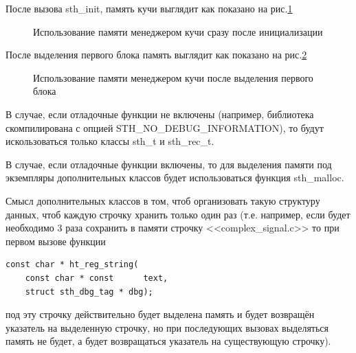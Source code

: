 \documentclass{article}
\begin{document}
После вызова sth\_init, память кучи выглядит как показано на рис.\ref{ris:memory1}
\begin{figure}[h!]
	\caption{Использование памяти менеджером кучи сразу после инициализации}
	\label{ris:memory1}
	\end{figure}

После выделения первого блока память выглядит как показано на рис.\ref{ris:memory2}
\begin{figure}[h!]
	\caption{Использование памяти менеджером кучи после выделения первого блока}
	\label{ris:memory2}
	\end{figure}

\newpage
В случае, если отладочные функции не включены (например, библиотека скомпилирована с опцией  STH\_NO\_DEBUG\_INFORMATION), то будут искользоваться только классы sth\_t и sth\_rec\_t.

В случае, если отладочные функции включены, то для выделения памяти под экземпляры дополнительных классов 
будет использоваться функция sth\_malloc.

Смысл дополнительных классов в том, чтоб организовать такую структуру данных, чтоб каждую строчку хранить только один раз (т.е. например, если будет необходимо 3 раза сохранить в памяти строчку <<complex\_signal.c>> то при первом вызове функции 
\begin{lstlisting}
const char * ht_reg_string(
    const char * const      text,
    struct sth_dbg_tag * dbg);
\end{lstlisting}
под эту строчку действительно будет выделена память и будет возвращён указатель на выделенную строчку, но при последующих вызовах выделяться память не будет, а будет возвращаться указатель на существующую строчку).
\end{document}

